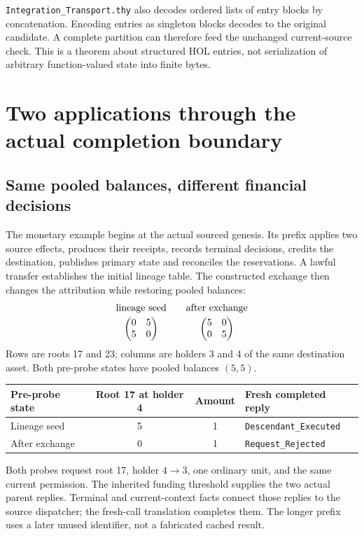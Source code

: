 \documentclass[10pt,a4paper]{article}
\newcommand{\code}[1]{\nolinkurl{#1}}
\newcommand{\source}[1]{\code{#1.thy}}
\begin{document}
\source{Integration_Transport} also decodes ordered lists of entry blocks by
concatenation. Encoding entries as singleton blocks decodes to the original
candidate. A complete partition can therefore feed the unchanged current-source
check. This is a theorem about structured HOL entries, not serialization of
arbitrary function-valued state into finite bytes.

\clearpage
\section{Two applications through the actual completion boundary}
\subsection{Same pooled balances, different financial decisions}
The monetary example begins at the actual sourced genesis. Its prefix applies
two source effects, produces their receipts, records terminal decisions,
credits the destination, publishes primary state and reconciles the reservations.
A lawful transfer establishes the initial lineage table. The constructed
exchange then changes the attribution while restoring pooled balances:
\[
 \begin{array}{c@{\qquad}c}
 \text{lineage seed}&\text{after exchange}\\[1mm]
 \begin{pmatrix}0&5\\5&0\end{pmatrix}&
 \begin{pmatrix}5&0\\0&5\end{pmatrix}
 \end{array}
\]
Rows are roots 17 and 23; columns are holders 3 and 4 of the same destination
asset. Both pre-probe states have pooled balances $(5,5)$.

\begin{center}
\begin{tabularx}{\textwidth}{@{}lccY@{}}
\toprule
Pre-probe state & Root 17 at holder 4 & Amount & Fresh completed reply\\
\midrule
Lineage seed & 5 & 1 & \code{Descendant_Executed}\\
After exchange & 0 & 1 & \code{Request_Rejected}\\
\bottomrule
\end{tabularx}
\end{center}

Both probes request root 17, holder $4\to3$, one ordinary unit, and the same
current permission. The inherited funding threshold supplies the two actual
parent replies. Terminal and current-context facts connect those replies to
the source dispatcher; the fresh-call translation completes them. The longer
prefix uses a later unused identifier, not a fabricated cached result.
\end{document}
